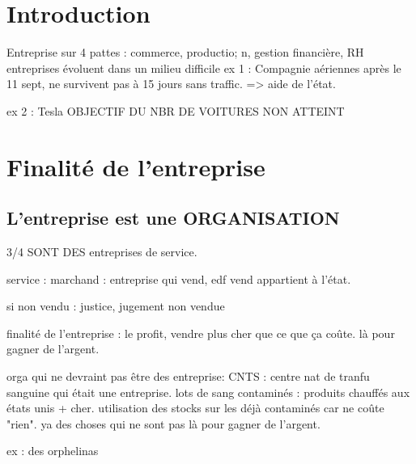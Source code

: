 \documentclass[a4paper,12pt]{article}
\date{\today}
\begin{document}
\renewcommand{\labelitemi}{\textbullet}


\pagebreak

\tableofcontents
\justify
\pagebreak

\section{Introduction}

Entreprise sur 4 pattes : commerce, productio; n, gestion financière, RH
entreprises évoluent dans un milieu difficile
ex 1 : Compagnie aériennes après le 11 sept, ne survivent pas à 15 jours sans traffic. => 
aide de l'état.

ex 2 : Tesla OBJECTIF DU NBR DE VOITURES	NON ATTEINT 


\section{Finalité de l'entreprise}

\subsection{L'entreprise est une ORGANISATION} 

3/4 SONT DES entreprises de service.

service : marchand : entreprise qui vend, edf vend appartient à l'état.

si non vendu : justice, jugement non vendue


finalité de l'entreprise : le profit, vendre plus cher que  ce que ça coûte.
là pour gagner de l'argent.


orga qui ne devraint pas être des entreprise: CNTS : centre nat de tranfu sanguine qui était une entreprise.
lots de sang contaminés : produits chauffés aux états unis + cher.
utilisation des stocks sur les déjà contaminés car ne coûte "rien".
ya des choses qui ne sont pas là pour gagner de l'argent.

ex : des  orphelinas
\end{document}

